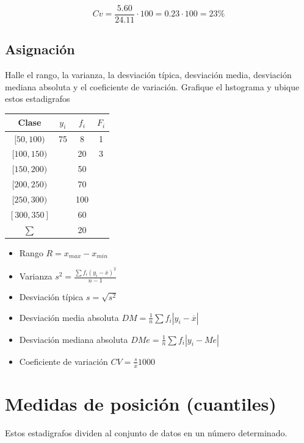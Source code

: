 \documentclass[
  11pt,
]{krantz}
\providecommand{\tightlist}{%
  \setlength{\itemsep}{0pt}\setlength{\parskip}{0pt}}
\theoremstyle{definition}
\theoremstyle{definition}
\theoremstyle{definition}
\theoremstyle{definition}
\theoremstyle{remark}
\begin{document}
\[Cv=\frac{5.60}{24.11}\cdot 100=0.23\cdot 100=23\%\]

\hypertarget{asignaciuxf3n-1}{%
\section{Asignación}\label{asignaciuxf3n-1}}

Halle el rango, la varianza, la desviación típica, desviación media, desviación mediana absoluta y el coeficiente de variación. Grafique el hstograma y ubique estos estadigrafos

\begin{longtable}[]{@{}cccc@{}}
\toprule
Clase & \(y_i\) & \(f_i\) & \(F_i\) \\
\midrule
\endhead
\([50,100)\) & 75 & 8 & 1 \\
\([100,150)\) & & 20 & 3 \\
\([150,200)\) & & 50 & \\
\([200,250)\) & & 70 & \\
\([250,300)\) & & 100 & \\
\([300,350]\) & & 60 & \\
\(\sum\) & & 20 & \\
\bottomrule
\end{longtable}

\begin{itemize}
\tightlist
\item
  Rango \(R=x_{max}-x_{min}\)
\item
  Varianza \(s^2=\frac{\sum f_i\left(y_i-\overline{x}\right )^2}{n-1}\)
\item
  Desviación típica \(s=\sqrt{s^2}\)
\item
  Desviación media absoluta \(DM=\frac{1}{n}\sum f_i\left\vert y_i-\overline{x}\right\vert\)
\item
  Desviación mediana absoluta \(DMe=\frac{1}{n}\sum f_i\left\vert y_i-Me\right\vert\)
\item
  Coeficiente de variación \(CV=\frac{s}{\overline{x}}1000\)
\end{itemize}

\hypertarget{medidas-de-posiciuxf3n-cuantiles}{%
\chapter{Medidas de posición (cuantiles)}\label{medidas-de-posiciuxf3n-cuantiles}}

Estos estadigrafos dividen al conjunto de datos en un número determinado.
\end{document}
